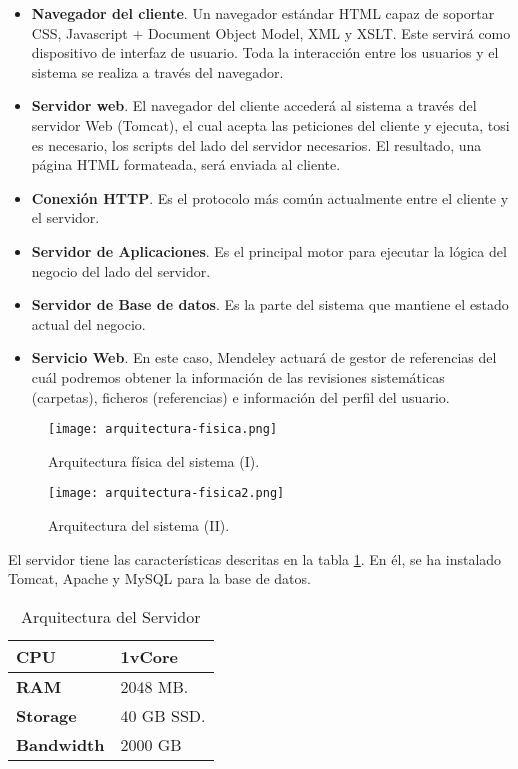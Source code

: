 \begin{itemize}
	\item \textbf{Navegador del cliente}. Un navegador estándar HTML capaz de soportar  CSS, Javascript + Document Object Model, XML y XSLT. Este servirá como dispositivo de interfaz de usuario. Toda la interacción entre los usuarios y el sistema se realiza a través del navegador.
	\item \textbf{Servidor web}. El navegador del cliente accederá al sistema a través del servidor Web (Tomcat), el cual acepta las peticiones del cliente y ejecuta, tosi es necesario, los scripts del lado del servidor necesarios. El resultado, una página HTML formateada, será enviada al cliente.
	\item \textbf{Conexión HTTP}. Es el protocolo más común actualmente entre el cliente y el servidor.
	\item \textbf{Servidor de Aplicaciones}. Es el principal motor para ejecutar la lógica del negocio del lado del servidor.
	\item \textbf{Servidor de Base de datos}. Es la parte del sistema que mantiene el estado actual del negocio.
	\item \textbf{Servicio Web}. En este caso, Mendeley actuará de gestor de referencias del cuál podremos obtener la información de las revisiones sistemáticas (carpetas), ficheros (referencias) e información del perfil del usuario.
\end{itemize}

\begin{figure}[!hp]
	\begin{center} 
		\texttt{[image: arquitectura-fisica.png]}
		\caption{Arquitectura física del sistema (I).}
		\label{fig:arquitectura-fisica01}
	\end{center}
\end{figure}

\begin{figure}[!hp]
	\begin{center} 
		\texttt{[image: arquitectura-fisica2.png]}
		\caption{Arquitectura del sistema (II).}
		\label{fig:arquitectura-fisica02}
	\end{center}
\end{figure}

El servidor tiene las características descritas en la tabla \ref{table:arqui-server}. En él, se ha instalado Tomcat, Apache y MySQL para la base de datos.

\begin{table}[!hbt]
	\begin{center}
		\begin{tabular}{|p{4cm}|p{11cm}|}
			\hline
			\textbf{CPU} & 1vCore\\
			\hline
			\textbf{RAM} & 2048 MB.\\
			\hline
			\textbf{Storage} & 40 GB SSD.\\
			\hline
			\textbf{Bandwidth} & 2000 GB\\
			\hline
		\end{tabular}
		\caption{Arquitectura del Servidor}
		\label{table:arqui-server}
	\end{center}
\end{table}

